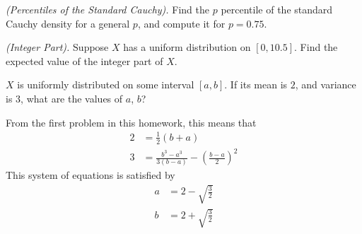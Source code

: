 \begin{problem}[Handout 12, \# 21]
  \emph{(Percentiles of the Standard Cauchy).} Find the \(p\)
  percentile of the standard Cauchy density for a general \(p\), and
  compute it for \(p=0.75\).
\end{problem}
\begin{solution}

\end{solution}
\newpage

\begin{problem}[Handout 12, \# 22]
  \emph{(Integer Part).} Suppose \(X\) has a uniform distribution on
  \([0,10.5]\). Find the expected value of the integer part of \(X\).
\end{problem}
\begin{solution}

\end{solution}
\newpage

\begin{problem}[Handout 12, \# 23]
  \(X\) is uniformly distributed on some interval \([a,b]\). If its mean is
  \(2\), and variance is \(3\), what are the values of \(a\), \(b\)?
\end{problem}
\begin{solution}
  From the first problem in this homework, this means that
  \begin{align*}
    2 &= \frac{1}{2} (b+a)\\
    3 &= \frac{b^3-a^3}{3(b-a)} - \left(\frac{b-a}{2}\right)^2
  \end{align*}
  This system of equations is satisfied by
  \begin{align*}
    a&= 2-\sqrt{\frac{3}{2}} \\
    b&= 2+\sqrt{\frac{3}{2}}
  \end{align*}
\end{solution}

